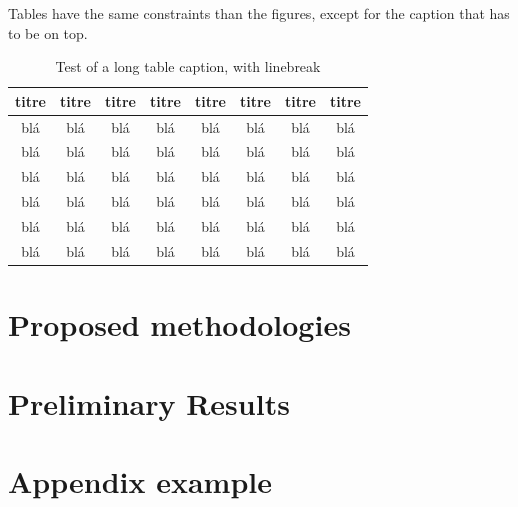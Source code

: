 \documentclass[letterpaper%
, twoside%
, 12pt%
,thesepararticles%
, english%
,creativecommons,hyperref, withAlgo2e%
]{thETS}
\begin{document}
Tables have the same constraints than the figures, except for the caption that has to be on top.


\begin{table}
\centering
		\parbox{0.65\textwidth}{\caption{Test of a long table caption, with linebreak}} %
		
		\begin{tabular}{|c|c|c|c|c|c|c|c|}
		\hline
			{\bf titre} & {\bf titre} & {\bf titre} & {\bf titre} & {\bf titre} & {\bf titre} & {\bf titre} & {\bf titre} \\
	  \hline
			blá & blá & blá & blá & blá & blá & blá & blá \\
	  \hline
			blá & blá & blá & blá & blá & blá & blá & blá \\
	  \hline
			blá & blá & blá & blá & blá & blá & blá & blá \\
	  \hline
			blá & blá & blá & blá & blá & blá & blá & blá \\
	  \hline
			blá & blá & blá & blá & blá & blá & blá & blá \\
	  \hline
			blá & blá & blá & blá & blá & blá & blá & blá \\
	  \hline
		\end{tabular}
\end{table}


\chapter{Proposed methodologies}
\chapter{Preliminary Results}


\begin{conclusion}

\lipsum[1] %

\end{conclusion}


\appendix

\multiannexe

% 

\chapter{Appendix example}
\end{document}
